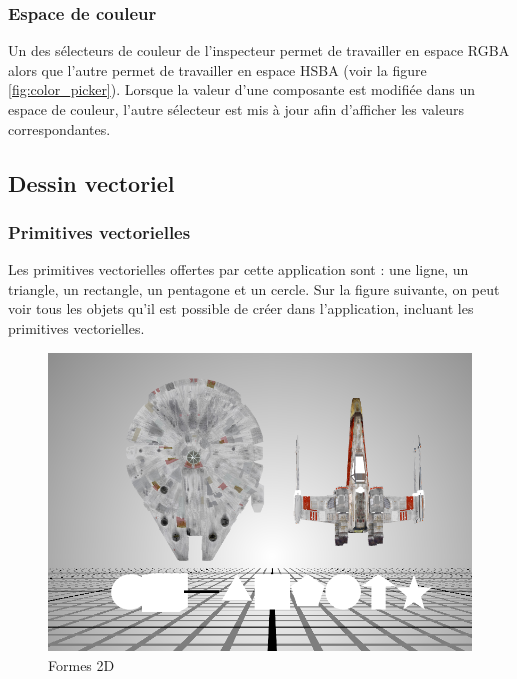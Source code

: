\subsubsection{Espace de couleur}
Un des sélecteurs de couleur de l'inspecteur permet de travailler en espace RGBA alors que l'autre permet de travailler en espace HSBA (voir la figure \ref{fig:color_picker}).
Lorsque la valeur d'une composante est modifiée dans un espace de couleur, l'autre sélecteur est mis à jour afin d'afficher les valeurs correspondantes.


\subsection{Dessin vectoriel}
\subsubsection{Primitives vectorielles}
Les primitives vectorielles offertes par cette application sont : une ligne, un triangle, un rectangle, un pentagone et un cercle.
Sur la figure suivante, on peut voir tous les objets qu'il est possible de créer dans l'application, incluant les primitives vectorielles.
\begin{figure}[H]
    \centering
	\includegraphics[scale=0.8]{fig/shapes.PNG}
	\caption{Formes 2D}
	\label{fig:primitives2D}
\end{figure}

